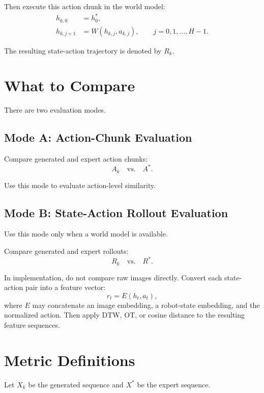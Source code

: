 \documentclass[11pt]{article}
\begin{document}
Then execute this action chunk in the world model:
\begin{align}
h_{k,0} &= h^*_0, \\
h_{k,j+1} &= W(h_{k,j},a_{k,j}),
\qquad j=0,1,\ldots,H-1.
\end{align}

The resulting state-action trajectory is denoted by $R_k$.

\section{What to Compare}

There are two evaluation modes.

\subsection{Mode A: Action-Chunk Evaluation}

Compare generated and expert action chunks:
\begin{equation}
A_k \quad \text{vs.} \quad A^*.
\end{equation}

Use this mode to evaluate action-level similarity.

\subsection{Mode B: State-Action Rollout Evaluation}

Use this mode only when a world model is available.

Compare generated and expert rollouts:
\begin{equation}
R_k \quad \text{vs.} \quad R^*.
\end{equation}

In implementation, do not compare raw images directly. Convert each state-action pair into a feature vector:
\begin{equation}
r_t=E(h_t,a_t),
\end{equation}
where $E$ may concatenate an image embedding, a robot-state embedding, and the normalized action.
Then apply DTW, OT, or cosine distance to the resulting feature sequences.

\section{Metric Definitions}

Let $X_k$ be the generated sequence and $X^*$ be the expert sequence.
\end{document}
